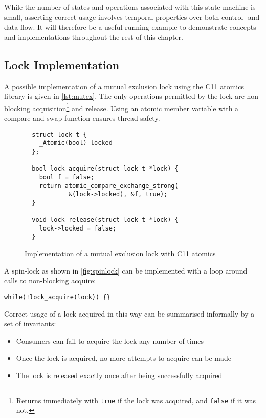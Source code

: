 While the number of states and operations associated with this state
machine is small, asserting correct usage involves temporal properties
over both control- and data-flow. It will therefore be a useful running
example to demonstrate concepts and implementations throughout the rest
of this chapter.

\subsection{Lock Implementation}

A possible implementation of a mutual exclusion lock using the C11
atomics library is given in \autoref{lst:mutex}. The only operations
permitted by the lock are non-blocking acquisition\footnote{Returns immediately
with \texttt{true} if the lock was acquired, and
\texttt{false} if it was not.} and release. Using an atomic
member variable with a compare-and-swap function ensures thread-safety.

\begin{figure}
  \begin{verbatim}
  struct lock_t {
    _Atomic(bool) locked
  };

  bool lock_acquire(struct lock_t *lock) {
    bool f = false;
    return atomic_compare_exchange_strong(
            &(lock->locked), &f, true);
  }

  void lock_release(struct lock_t *lock) {
    lock->locked = false;
  }
  \end{verbatim}
  \caption{Implementation of a mutual exclusion lock with C11 atomics}
  \label{lst:mutex}
\end{figure}

A spin-lock as shown in \autoref{fig:spinlock} can be implemented with a
loop around calls to non-blocking acquire:

\begin{verbatim}
while(!lock_acquire(lock)) {}
\end{verbatim}

Correct usage of a lock acquired in this way can be summarised
informally by a set of invariants:
\begin{itemize}
  \item Consumers can fail to acquire the lock any number of times
  \item Once the lock is acquired, no more attempts to acquire can be made
  \item The lock is released exactly once after being successfully acquired
\end{itemize}

